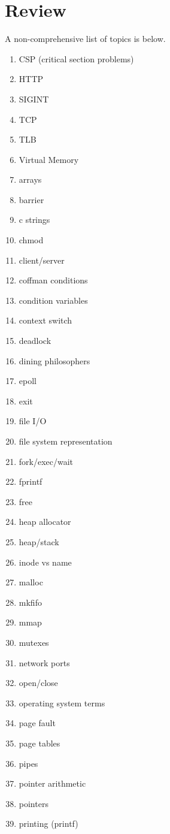 \chapter{Review}

A non-comprehensive list of topics is below.

\begin{enumerate}
\item CSP (critical section problems)
\item HTTP
\item SIGINT
\item TCP
\item TLB
\item Virtual Memory
\item arrays
\item barrier
\item c strings
\item chmod
\item client/server
\item coffman conditions
\item condition variables
\item context switch
\item deadlock
\item dining philosophers
\item epoll
\item exit
\item file I/O
\item file system representation
\item fork/exec/wait
\item fprintf
\item free
\item heap allocator
\item heap/stack
\item inode vs name
\item malloc
\item mkfifo
\item mmap
\item mutexes
\item network ports
\item open/close
\item operating system terms
\item page fault
\item page tables
\item pipes
\item pointer arithmetic
\item pointers
\item printing (printf)

\end{enumerate}
